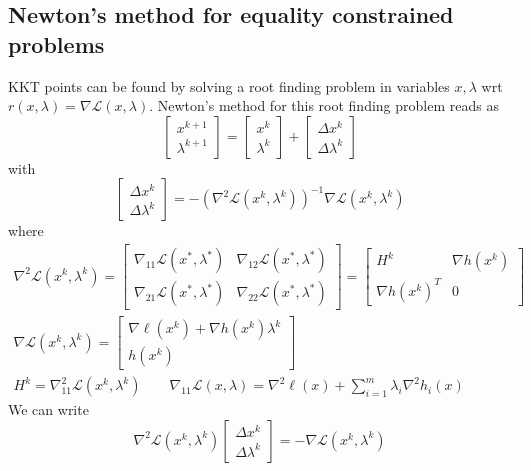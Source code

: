 \documentclass[openany]{book}
\theoremstyle{definition}
\theoremstyle{remark}
\begin{document}
\subsection{Newton's method for equality constrained problems}
KKT points can be found by solving a root finding problem in variables $x,\lambda$ wrt $r(x,\lambda)=\nabla \mathcal{L}(x,\lambda)$. Newton's method for this root finding problem reads as 
\[
    \begin{bmatrix}
        x^{k+1} \\ \lambda^{k+1}
        \end{bmatrix} = \begin{bmatrix}
        x^k \\ \lambda^k
        \end{bmatrix} + \begin{bmatrix}
        \Delta x^k \\ \Delta \lambda^k
    \end{bmatrix}
\]
with 
\[
    \begin{bmatrix}
        \Delta x^k \\ \Delta \lambda^k
    \end{bmatrix} = -(\nabla^2 \mathcal{L}(x^k,\lambda^k))^{-1}\nabla \mathcal{L}(x^k,\lambda^k)
\]
where 
\begin{gather*}
    \nabla^2\mathcal{L}(x^k,\lambda^k)= \begin{bmatrix}
        \nabla_{11} \mathcal{L}(x^*,\lambda^*) & \nabla_{12} \mathcal{L}(x^*,\lambda^*)\\
        \nabla_{21} \mathcal{L}(x^*,\lambda^*) & \nabla_{22} \mathcal{L}(x^*,\lambda^*)
        \end{bmatrix} = \begin{bmatrix}
        H^k & \nabla h(x^k) \\
        \nabla h(x^k)^T & 0
        \end{bmatrix} \\ \nabla \mathcal{L}(x^k,\lambda^k) = \begin{bmatrix}
        \nabla \ell(x^k)+\nabla h(x^k)\lambda^k \\ h(x^k)
    \end{bmatrix} \\
    H^k = \nabla_{11}^2 \mathcal{L}(x^k,\lambda^k) \qquad
    \nabla_{11}\mathcal{L}(x,\lambda) = \nabla^2 \ell(x) + \displaystyle\sum_{i=1}^{m}\lambda_i\nabla^2h_i(x)
\end{gather*}
We can write 
\[
    \nabla^2\mathcal{L}(x^k,\lambda^k)\begin{bmatrix}
        \Delta x^k \\ \Delta \lambda^k
    \end{bmatrix} = -\nabla \mathcal{L}(x^k,\lambda^k)
\]
\end{document}
